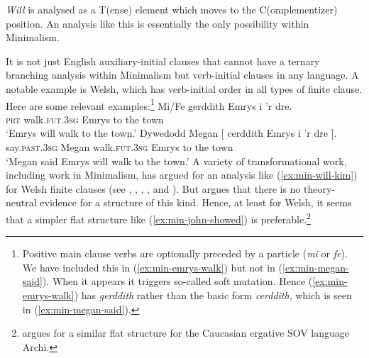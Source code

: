 \documentclass[output=paper]{langsci/langscibook}
\begin{document}
\textit{Will} is analysed as a T(ense) element which moves to the C(omplementizer) position. An analysis like this is essentially the only possibility within Minimalism.

It is not just English auxiliary-initial clauses that cannot have a ternary branching analysis within Minimalism but verb-initial clauses in any language. A notable example is Welsh, which has verb-initial order in all types of finite clause. Here are some relevant examples:\footnote{%
	Positive main clause verbs are optionally preceded by a particle (\textit{mi} or \textit{fe}). We have included this in (\ref{ex:min-emrys-walk}) but not in (\ref{ex:min-megan-said}). When it appears it triggers so-called soft mutation. Hence (\ref{ex:min-emrys-walk}) has \textit{gerddith} rather than the basic form \textit{cerddith}, which is seen in (\ref{ex:min-megan-said}).
}
\eal
\ex\label{ex:min-emrys-walk}
\gll Mi/Fe gerddith Emrys i 'r dre.\\
\textsc{prt} walk.\textsc{fut}.\textsc{3sg} Emrys to the town\\
\glt`Emrys will walk to the town.'
\ex\label{ex:min-megan-said}
\gll Dywedodd Megan [ cerddith Emrys i 'r dre ].\\
say.\textsc{past}.\textsc{3sg} Megan {} walk.\textsc{fut}.\textsc{3sg} Emrys to the town {}\\
\glt`Megan said Emrys will walk to the town.'
\zl
A variety of transformational work, including work in Minimalism, has argued for an analysis like (\ref{ex:min-will-kim}) for Welsh finite clauses (see \eg \citealt{JonesThomas.1977}, \citealt{Sproat.1985}, \citealt{Sadler.1988}, \citealt{Rouveret.1994}, and \citealt{Roberts.2005}). But \citet{Borsley.2006b} argues that there is no theory-neutral evidence for a structure of this kind. Hence, at least for Welsh, it seems that a simpler flat structure like (\ref{ex:min-john-showed}) is preferable.\footnote{%
	\citet{Borsley.2016} argues for a similar flat structure for the Caucasian ergative SOV language Archi.%
}
\end{document}
